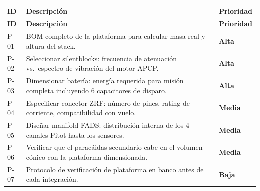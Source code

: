 \documentclass[11pt, a4paper]{article}
\begin{document}
\begin{longtable}{C{1cm} L{8cm} C{2.2cm}}
  \color{white}\textbf{ID}&\color{white}\textbf{Descripci\'{o}n}&\color{white}\textbf{Prioridad}\\
  \endfirsthead
  \color{white}\textbf{ID}&\color{white}\textbf{Descripci\'{o}n}&\color{white}\textbf{Prioridad}\\
  \endhead
  P-01 & BOM completo de la plataforma para calcular masa real y altura del stack. & \textcolor{tlvred}{\textbf{Alta}} \\
  P-02 & Seleccionar silentblocks: frecuencia de atenuaci\'{o}n vs.\ espectro de vibraci\'{o}n del motor APCP. & \textcolor{tlvred}{\textbf{Alta}} \\
  P-03 & Dimensionar bater\'{i}a: energ\'{i}a requerida para misi\'{o}n completa incluyendo 6 capacitores de disparo. & \textcolor{tlvred}{\textbf{Alta}} \\
  P-04 & Especificar conector ZRF: n\'{u}mero de pines, rating de corriente, compatibilidad con vuelo. & \textcolor{tlvorange}{\textbf{Media}} \\
  P-05 & Dise\~{n}ar manifold FADS: distribuci\'{o}n interna de los 4 canales Pitot hasta los sensores. & \textcolor{tlvorange}{\textbf{Media}} \\
  P-06 & Verificar que el parac\'{a}idas secundario cabe en el volumen c\'{o}nico con la plataforma dimensionada. & \textcolor{tlvorange}{\textbf{Media}} \\
  P-07 & Protocolo de verificaci\'{o}n de plataforma en banco antes de cada integraci\'{o}n. & \textbf{Baja} \\
\end{longtable}
\end{document}
